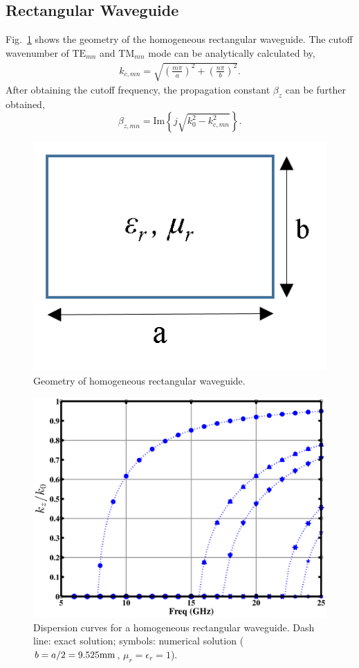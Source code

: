 \documentclass{pj}
\begin{document}
\subsection{Rectangular Waveguide}
Fig.~\ref{fig:rect_geom} shows the geometry of the homogeneous rectangular waveguide. The cutoff wavenumber of $\mathrm{TE}_{mn}$ and $\mathrm{TM}_{mn}$ mode can be analytically calculated by,
\begin{eqnarray}
k_{c,mn} = \sqrt{\left( \frac{m \pi}{a}\right) ^2 + \left(\frac{n \pi}{b}\right)^2 }. 
\end{eqnarray}
After obtaining the cutoff frequency, the propagation constant $\beta_z$ can be further obtained,
\begin{equation}
\beta _{z,mn} = \mathrm{Im} \left \{ j\sqrt{k_0^2 - k_{c,mn}^2} \right \}.
\label{eq:rect_beta_z}
\end{equation}

\begin{figure}[htbp]
	\centering
	\includegraphics[width=0.3\columnwidth]{./img/rectangular/geometry.png}
	\caption{Geometry of homogeneous rectangular waveguide. }
	\label{fig:rect_geom} %
\end{figure}
\begin{figure}[htbp]
	\centering
	\includegraphics[width=\defaultfigurewidth]{./img/rectangular/dispersion.eps}
	\caption{Dispersion curves for a homogeneous rectangular waveguide. Dash line: exact solution; symbols: numerical solution ($b=a/2=9.525\rm{mm}$, $\mu_r=\epsilon_r=1$).}
	\label{fig:rect_dispersion}
\end{figure}
\end{document}
